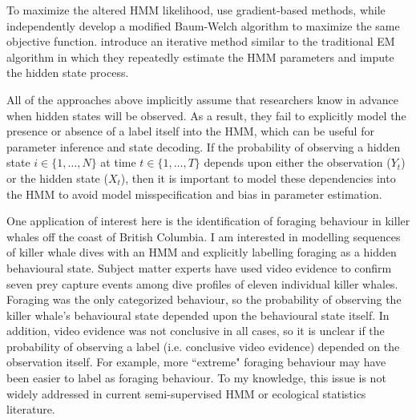 To maximize the altered HMM likelihood, \citet{McClintock:2018} use gradient-based methods, while \citet{Li:2021} independently develop a modified Baum-Welch algorithm to maximize the same objective function. \citet{Tamposis:2018} introduce an iterative method similar to the traditional EM algorithm in which they repeatedly estimate the HMM parameters and impute the hidden state process. %

All of the approaches above implicitly assume that researchers know in advance when hidden states will be observed. As a result, they fail to explicitly model the presence or absence of a label itself into the HMM, which can be useful for parameter inference and state decoding. If the probability of observing a hidden state $i \in \{1,\ldots,N\}$ at time $t \in \{1,\ldots,T\}$ depends upon either the observation ($Y_t$) or the hidden state ($X_t$), then it is important to model these dependencies into the HMM to avoid model misspecification and bias in parameter estimation.
%
%

One application of interest here is the identification of foraging behaviour in killer whales off the coast of British Columbia. I am interested in modelling sequences of killer whale dives with an HMM and explicitly labelling foraging as a hidden behavioural state. Subject matter experts have used video evidence to confirm seven prey capture events among dive profiles of eleven individual killer whales. Foraging was the only categorized behaviour, so the probability of observing the killer whale's behavioural state depended upon the behavioural state itself. In addition, video evidence was not conclusive in all cases, so it is unclear if the probability of observing a label (i.e. conclusive video evidence) depended on the observation itself. For example, more ``extreme" foraging behaviour may have been easier to label as foraging behaviour. To my knowledge, this issue is not widely addressed in current semi-supervised HMM or ecological statistics literature. 

